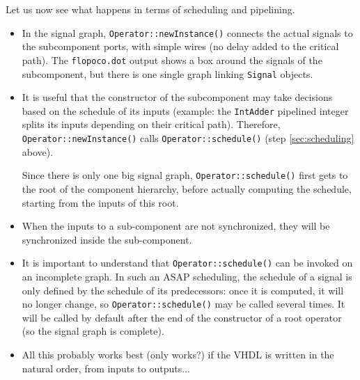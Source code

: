 \documentclass{article}
\begin{document}
Let us now see what happens in terms of scheduling and pipelining.
\begin{itemize}
\item In the signal graph, \verb!Operator::newInstance()! connects the actual signals to the subcomponent ports, with simple wires (no delay added to the critical path).
  The \texttt{flopoco.dot} output shows a box around the signals of the subcomponent, but there is one single graph linking \texttt{Signal} objects.

\item It is useful that the constructor of the subcomponent may take decisions based on the schedule of its inputs (example: the \texttt{IntAdder} pipelined integer splits its inputs depending on their critical path).
  Therefore, \verb!Operator::newInstance()! calls \verb!Operator::schedule()! (step \ref{sec:scheduling} above).

  Since there is only one big signal graph, \verb!Operator::schedule()! first gets to the root of the component hierarchy, before actually computing the schedule, starting from the inputs of this root.

\item When the inputs to a sub-component are not synchronized, they will be synchronized inside the sub-component.

\item It is important to understand that \verb!Operator::schedule()! can be invoked on an incomplete graph.
  In such an ASAP scheduling, the schedule of a signal is only defined by the schedule of its predecessors: once it is computed, it will no longer change, so \verb!Operator::schedule()! may be called several times. It will be called by default after the end of the constructor of a root operator (so the signal graph is complete).

\item All this probably works best (only works?) if the VHDL is written in the natural order, from inputs to outputs... 

\end{itemize}
\end{document}
